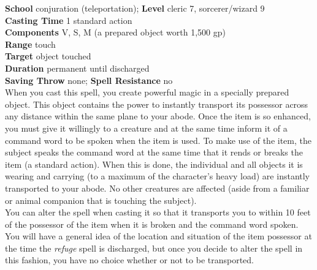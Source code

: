 \textbf{School} conjuration (teleportation); \textbf{Level} cleric 7, sorcerer/wizard 9\\
\textbf{Casting Time} 1 standard action\\
\textbf{Components} V, S, M (a prepared object worth 1,500 gp)\\
\textbf{Range} touch\\
\textbf{Target} object touched\\
\textbf{Duration} permanent until discharged\\
\textbf{Saving Throw} none; \textbf{Spell Resistance} no\\
When you cast this spell, you create powerful magic in a specially prepared object. This object contains the power to instantly transport its possessor across any distance within the same plane to your abode. Once the item is so enhanced, you must give it willingly to a creature and at the same time inform it of a command word to be spoken when the item is used. To make use of the item, the subject speaks the command word at the same time that it rends or breaks the item (a standard action). When this is done, the individual and all objects it is wearing and carrying (to a maximum of the character's heavy load) are instantly transported to your abode. No other creatures are affected (aside from a familiar or animal companion that is touching the subject).\\
You can alter the spell when casting it so that it transports you to within 10 feet of the possessor of the item when it is broken and the command word spoken. You will have a general idea of the location and situation of the item possessor at the time the \textit{refuge }spell is discharged, but once you decide to alter the spell in this fashion, you have no choice whether or not to be transported.\\
